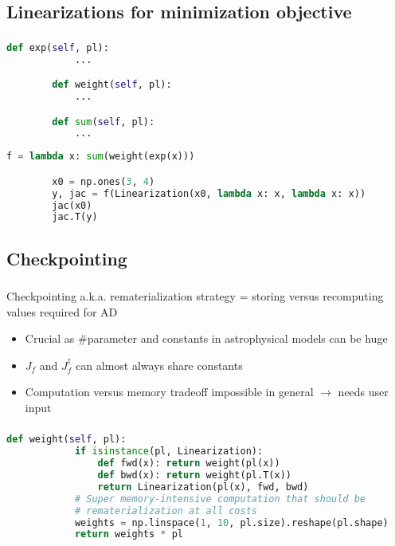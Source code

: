 \documentclass[aspectratio=169,xcolor=dvipsnames]{beamer}
\begin{document}
\subsection{Linearizations for minimization objective}
\begin{frame}[fragile]
	\frametitle{\insertsection}
	\framesubtitle{\insertsubsection}

	\begin{lstlisting}[language=python,escapechar=!]
		def exp(self, pl):
			...

		def weight(self, pl):
			...

		def sum(self, pl):
			...
	\end{lstlisting}

	\begin{lstlisting}[language=python,escapechar=!]
		f = lambda x: sum(weight(exp(x)))

		x0 = np.ones(3, 4)
		y, jac = f(Linearization(x0, lambda x: x, lambda x: x))
		jac(x0)
		jac.T(y)
	\end{lstlisting}

\end{frame}

\subsection{Checkpointing}
\begin{frame}
	\frametitle{\insertsection}
	\framesubtitle{\insertsubsection}

	Checkpointing a.k.a. rematerialization strategy = storing versus recomputing values required for AD

	\begin{itemize}
		\item Crucial as \#parameter and constants in astrophysical models can be huge
		\item $J_f$ and $J_f^\dagger$ can almost always share constants
		\item Computation versus memory tradeoff impossible in general $\rightarrow$ needs user input
	\end{itemize}

\end{frame}

\begin{frame}[fragile]
	\frametitle{\insertsection}
	\framesubtitle{\insertsubsection}

	\begin{lstlisting}[language=python,escapechar=!]
		def weight(self, pl):
			if isinstance(pl, Linearization):
				def fwd(x): return weight(pl(x))
				def bwd(x): return weight(pl.T(x))
				return Linearization(pl(x), fwd, bwd)
			# Super memory-intensive computation that should be
			# rematerialization at all costs
			weights = np.linspace(1, 10, pl.size).reshape(pl.shape)
			return weights * pl
	\end{lstlisting}
\end{frame}
\end{document}
